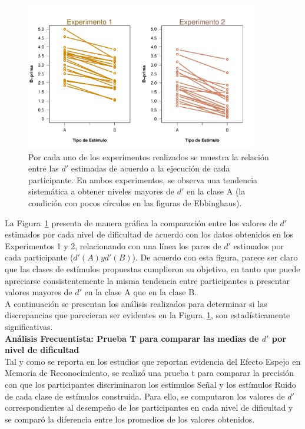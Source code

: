 \begin{figure}[th]
\centering
\includegraphics[width=0.90\textwidth]{Figures/Diff_D_E1yE2}
\caption[Diferencias entre las $d'$ de los niveles de dificultad propuestos]{Por cada uno de los experimentos realizados se muestra la relación entre las $d'$ estimadas de acuerdo a la ejecución de cada participante. En ambos experimentos, se observa una tendencia sistemática a obtener niveles mayores de $d'$ en la clase A (la condición con pocos círculos en las figuras de Ebbinghaus).}
\label{fig:Diff_D}
\end{figure}

La Figura~\ref{fig:Diff_D} presenta de manera gráfica la comparación entre los valores de $d'$ estimados por cada nivel de dificultad de acuerdo con los datos obtenidos en los Experimentos 1 y 2, relacionando con una línea los pares de $d'$ estimados por cada participante ($d'(A) y d'(B)$). De acuerdo con esta figura, parece ser claro que las clases de estímulos propuestas cumplieron su objetivo, en tanto que puede apreciarse consistentemente la misma tendencia entre participantes a presentar valores mayores de $d'$ en la clase A que en la clase B.\\

A continuación se presentan los análisis realizados para determinar si las discrepancias que parecieran ser evidentes en la Figura~\ref{fig:Diff_D}, son estadísticamente significativas.\\

\textbf{Análisis Frecuentista: Prueba T para comparar las medias de $d'$ por nivel de dificultad}\\

Tal y como se reporta en los estudios que reportan evidencia del Efecto Espejo en Memoria de Reconocimiento, se realizó una prueba t para comparar la precisión con que los participantes discriminaron los estímulos Señal y los estímulos Ruido de cada clase de estímulos construida. Para ello, se computaron los valores de $d'$ correspondientes al desempeño de los participantes en cada nivel de dificultad y se comparó la diferencia entre los promedios de los valores obtenidos.\\

